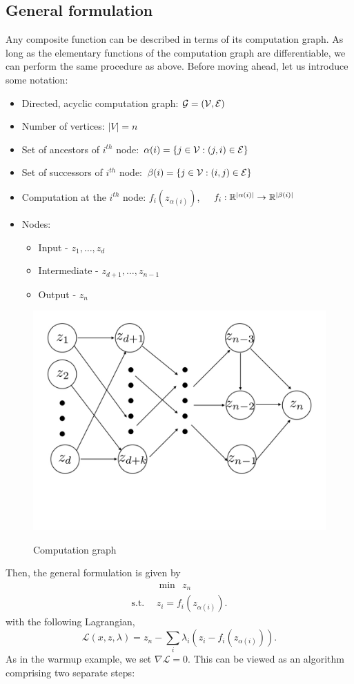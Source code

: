 \subsection{General formulation}
Any composite function can be described in terms of its computation graph. As
long as the elementary functions of the computation graph are differentiable, we can perform the same procedure as above. Before moving ahead, let us introduce some notation: 
\begin{itemize}
\item Directed, acyclic computation graph: $\mathcal{G} = ({\cal V}, {\cal E})$
\item Number of vertices: $|V| = n$
\item Set of ancestors of $i^{th}$ node: $\alpha(i) = \{ j \in {\cal V}: (j, i) \in {\cal E}\}$
\item Set of successors of $i^{th}$ node: $\beta(i) = \{ j\in {\cal V}: (i, j) \in {\cal E}\}$
\item Computation at the $i^{th}$ node: $f_i(z_{\alpha(i)})$, $\quad f_i: \mathbb{R}^{|\alpha(i)|} \rightarrow \mathbb{R}^{|\beta(i)|}$
\item Nodes:
\begin{itemize}
\item Input - $z_1,\dots,z_ d$
\item Intermediate - $z_{d+1}, \dots, z_{n-1}$
\item Output - $z_n$
\end{itemize}
\end{itemize}

\begin{figure}
 \centering
\includegraphics[width=0.7\linewidth, height=0.4\linewidth]{figures/lecture16_computation_graph.pdf} 
\label{fig:subim1}
\caption{Computation graph}
\end{figure}
\noindent
Then, the general formulation is given by
\begin{align}
&\min \ \ z_n \\
\text{s.t.} \ \ &z_i = f_i(z_{\alpha(i)}). \nonumber
\end{align}
with the following Lagrangian,
\begin{equation}
\mathcal{L}(x, z, \lambda) = z_n - \sum_{i} \lambda_i (z_i - f_i(z_{\alpha(i)})).
\end{equation}
As in the warmup example, we set $\nabla \mathcal{L} = 0$. This can be viewed as an algorithm comprising two separate steps:
